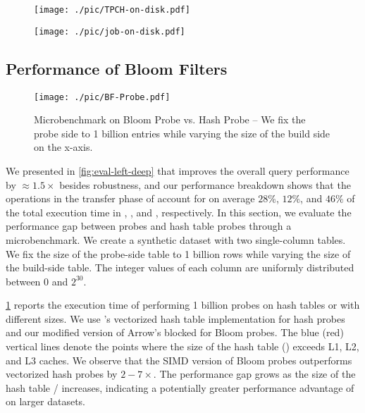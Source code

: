 \begin{figure*}[t!]
    \centering
    \begin{subfigure}{0.46\linewidth}
        \texttt{[image: ./pic/TPCH-on-disk.pdf]}
        \caption{\tpch}
    \end{subfigure}
    \begin{subfigure}{0.51\linewidth}
        \texttt{[image: ./pic/job-on-disk.pdf]}
        \caption{\job}
    \end{subfigure}
    \caption{Comparison of the execution time of \duckdb and \rpt (with optimizer's plan) for each query in \tpch and \job when the base tables reside on disk (on-disk) + the intermediate results do not fit in memory (+spill) \textnormal{-- Normalized by the execution time of default \duckdb with base tables on disk.}}
    \label{fig:on-disk}
\end{figure*}

\subsection{Performance of Bloom Filters}
\label{sec:eval:bloomfilter}

\begin{figure}[t!]
    \centering
    \texttt{[image: ./pic/BF-Probe.pdf]}
    \caption{Microbenchmark on Bloom Probe vs. Hash Probe \textnormal{-- We fix the probe side to 1 billion entries while varying the size of the build side on the x-axis.}}
    \label{fig:bf-probe}
\end{figure}

We presented in \cref{fig:eval-left-deep} that \rpt improves the overall query performance by $\approx$$1.5\times$ besides robustness, and our performance breakdown shows that the \BF operations in the transfer phase of \rpt account for on average $28\%$, $12\%$, and $46\%$ of the total execution time in \tpch, \job, and \tpcds, respectively. In this section, we evaluate the performance gap between \BF probes and hash table probes through a microbenchmark. We create a synthetic dataset with two single-column tables. We fix the size of the probe-side table to 1 billion rows while varying the size of the build-side table. The integer values of each column are uniformly distributed between $0$ and $2^{30}$.

\cref{fig:bf-probe} reports the execution time of performing 1 billion probes on hash tables or \BFs with different sizes. We use \duckdb's vectorized hash table implementation for hash probes and our modified version of Arrow's blocked \BF for Bloom probes. The blue (red) vertical lines denote the points where the size of the hash table (\BF) exceeds L1, L2, and L3 caches. We observe that the SIMD version of Bloom probes outperforms vectorized hash probes by $2-7\times$. The performance gap grows as the size of the hash table / \BFs increases, indicating a potentially greater performance advantage of \rpt on larger datasets.